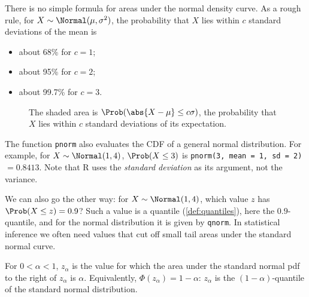 There is no simple formula for areas under the normal density curve. As a rough rule, for $X \sim \Normal(\mu, \sigma^2)$, the probability that $X$ lies within $c$ standard deviations of the mean is
\begin{itemize}
  \item about 68\% for $c = 1$;
  \item about 95\% for $c = 2$;
  \item about 99.7\% for $c = 3$.
\end{itemize}

\begin{figure}[ht]
\centering
{}
\caption{The shaded area is $\Prob(\abs{X - \mu} \le c\sigma)$, the probability that $X$ lies within $c$ standard deviations of its expectation.}
\label{fig:normal-within-c-sd}
\end{figure}


The function \texttt{pnorm} also evaluates the CDF of a general normal distribution. For example, for $X \sim \Normal(1, 4)$, $\Prob(X \le 3)$ is \texttt{pnorm(3, mean = 1, sd = 2)} $= 0.8413$. Note that R uses the \emph{standard deviation} as its argument, not the variance.

We can also go the other way: for $X \sim \Normal(1, 4)$, which value $z$ has $\Prob(X \le z) = 0.9$? Such a value is a quantile (\cref{def:quantiles}), here the $0.9$-quantile, and for the normal distribution it is given by \texttt{qnorm}. In statistical inference we often need values that cut off small tail areas under the standard normal curve.

\begin{definition}[$z_\alpha$]\label{def:z-alpha}
For $0 < \alpha < 1$, $z_\alpha$ is the value for which the area under the standard normal pdf to the right of $z_\alpha$ is $\alpha$. Equivalently, $\Phi(z_\alpha) = 1 - \alpha$: $z_\alpha$ is the $(1 - \alpha)$-quantile of the standard normal distribution.
\end{definition}

